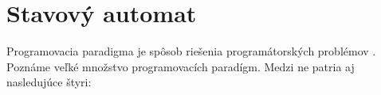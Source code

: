 \section{Stavový automat}
\noindent Programovacia paradigma je spôsob riešenia programátorských problémov \cite{Samuel2018AnII}. Poznáme veľké množstvo programovacích paradígm. Medzi ne patria aj nasledujúce štyri:
